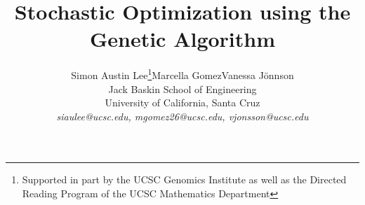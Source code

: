 \title{Stochastic Optimization using the Genetic Algorithm}

\author{ 
Simon Austin Lee\thanks{Supported in part by the UCSC Genomics Institute as well as the Directed Reading Program of the UCSC Mathematics Department }\hspace{.5cm}Marcella Gomez\hspace{.5cm}Vanessa J\"{o}nnson\\
Jack Baskin School of Engineering \\
University of California, Santa Cruz\\
\emph{siaulee@ucsc.edu, mgomez26@ucsc.edu, vjonsson@ucsc.edu}
}\date{}
\maketitle 
